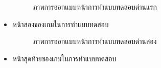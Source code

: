 \documentclass[12pt,oneside,openright,a4paper]{cpe-thai-project}
\begin{document}
\begin{itemize}
  \begin{figure}[!ht]\centering
    \setlength{\fboxrule}{0.2mm} %
    \setlength{\fboxsep}{1cm}
    \caption{ภาพการออกแบบหน้าการทำแบบทดสอบด่านแรก}\label{fig:system}
  \end{figure}
  \item หน้าสองของเกมในการทำแบบทดสอบ
  \begin{figure}[!ht]\centering
    \setlength{\fboxrule}{0.2mm} %
    \setlength{\fboxsep}{1cm}
    \caption{ภาพการออกแบบหน้าการทำแบบทดสอบด่านสอง}\label{fig:system}
  \end{figure}
  \newpage
  \item หน้าสุดท้ายของเกมในการทำแบบทดสอบ
  \begin{figure}[!ht]\centering
    \setlength{\fboxrule}{0.2mm} %
    \setlength{\fboxsep}{1cm}

\end{figure}
\end{itemize}
\end{document}
